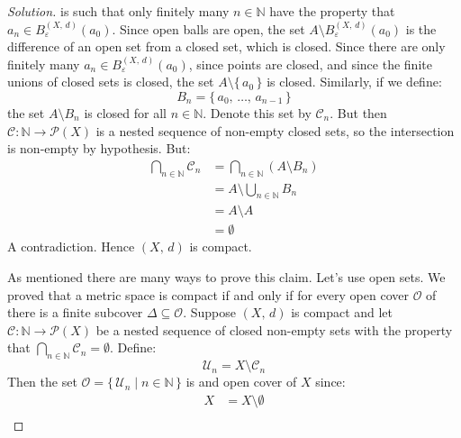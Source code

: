 \documentclass{article}
\theoremstyle{normal}
\begin{document}
\begin{proof}[Solution]
        is such that only finitely many $n\in\mathbb{N}$ have the property
        that $a_{n}\in{B}_{\varepsilon}^{(X,\,d)}(a_{0})$. Since open balls
        are open, the set $A\setminus{B}_{\varepsilon}^{(X,\,d)}(a_{0})$
        is the difference of an open set from a closed set, which is closed.
        Since there are only finitely many
        $a_{n}\in{B}_{\varepsilon}^{(X,\,d)}(a_{0})$, since points are closed,
        and since the finite unions of closed sets is closed, the set
        $A\setminus\{\,a_{0}\,\}$ is closed. Similarly, if we define:
        \begin{equation}
            B_{n}=\{\,a_{0},\,\dots,\,a_{n-1}\,\}
        \end{equation}
        the set $A\setminus{B}_{n}$ is closed for all $n\in\mathbb{N}$.
        Denote this set by $\mathcal{C}_{n}$. But then
        $\mathcal{C}:\mathbb{N}\rightarrow\mathcal{P}(X)$ is a nested sequence
        of non-empty closed sets, so the intersection is non-empty by
        hypothesis. But:
        \begin{align}
            \bigcap_{n\in\mathbb{N}}\mathcal{C}_{n}
            &=\bigcap_{n\in\mathbb{N}}(A\setminus{B}_{n})\\
            &=A\setminus\bigcup_{n\in\mathbb{N}}B_{n}\\
            &=A\setminus{A}\\
            &=\emptyset
        \end{align}
        A contradiction. Hence $(X,\,d)$ is compact.
        \par\hfill\par
        As mentioned there are many ways to prove this claim. Let's use
        open sets. We proved that a metric space is compact if and only if
        for every open cover $\mathcal{O}$ of there is a finite subcover
        $\Delta\subseteq\mathcal{O}$. Suppose $(X,\,d)$ is compact and let
        $\mathcal{C}:\mathbb{N}\rightarrow\mathcal{P}(X)$ be a nested sequence
        of closed non-empty sets with the property that
        $\bigcap_{n\in\mathbb{N}}\mathcal{C}_{n}=\emptyset$. Define:
        \begin{equation}
            \mathcal{U}_{n}=X\setminus\mathcal{C}_{n}
        \end{equation}
        Then the set $\mathcal{O}=\{\,\mathcal{U}_{n}\;|\;n\in\mathbb{N}\,\}$ is
        and open cover of $X$ since:
        \begin{align}
            X&=X\setminus\emptyset\\

\end{align}
\end{proof}
\end{document}

